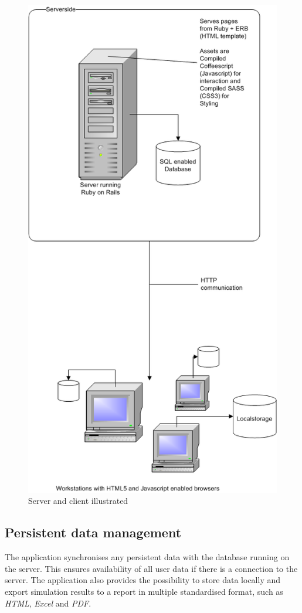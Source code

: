 \documentclass{report}
\begin{document}
			\begin{figure}
			\centering
				\includegraphics[scale=0.8]{EAD.png}
			\caption{Server and client illustrated}
			\label{fig:csillustration}
			\end{figure}
\clearpage
		\subsection{Persistent data management}
			The application synchronises any persistent data with the database running on the server. This ensures availability of all user data if there is a connection to the server. The application also provides the possibility to store data locally and export simulation results to a report in multiple standardised format, such as \emph{HTML}, \emph{Excel} and \emph{PDF}.			
\end{document}
